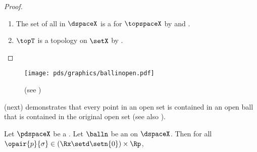 \begin{proof}
\begin{enumerate}
  \item The set of all  in $\dspaceX$ is a  for $\topspaceX$ by 
         and .
        
  \item $\topT$ is a topology on $\setX$ by .
\end{enumerate}
\end{proof}

\begin{figure}[h]
  \center
  \texttt{[image: pds/graphics/ballinopen.pdf]}
  \caption{ (see ) \label{fig:ms_open} }
\end{figure}
 (next) demonstrates that every point in an open set is contained in an open ball that is 
contained in the original open set (see also ).
\begin{lemma}
\label{lem:tri_open}
Let $\pdspaceX$ be a .
Let $\balln$ be an  on $\dspaceX$.
Then for all $\opair{p}{\sigma}\in(\Rx\setd\setn{0})\times\Rp$,
\\
\end{lemma}

